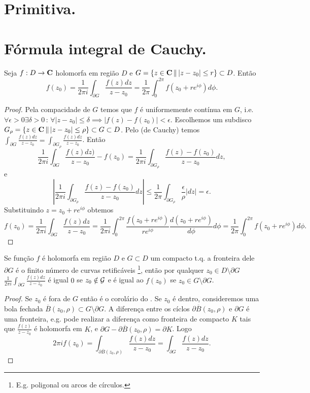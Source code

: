 \section{Primitiva.}


\section{Fórmula integral de Cauchy.}

\begin{teorema}
Seja $f : D \to \mathbf{C}$ holomorfa em região $D$
e $G = \{ z\in\mathbf{C} \,\|\, |z-z_0| \leq r \} \subset D$. Então
\[ f(z_0) = \frac1{2\pi i} \int_{\partial G} \frac{f(z)dz}{z-z_0} = \frac1{2\pi} \int_0^{2\pi} f(z_0 + r e^{i\phi}) d\phi. \]
\end{teorema}
\begin{proof}
Pela compacidade de $G$ temos que $f$ é uniformemente contínua em $G$, i.e.
$\forall \epsilon > 0 \exists\delta >0 \,:\, \forall |z-z_0|\leq\delta \implies |f(z)-f(z_0)| < \epsilon$.
Escolhemos um subdisco $G_\rho = \{ z\in\mathbf{C} \,\|\, |z-z_0| \leq \rho \} \subset G \subset D$.
Pelo  (de Cauchy) temos
$\int_{\partial G} \frac{f(z) dz}{z-z_0} = \int_{\partial G_\rho} \frac{f(z) dz}{z-z_0}$.
Então
\begin{equation*}
\frac1{2\pi i} \int_{\partial G} \frac{f(z)dz)}{z-z_0} - f(z_0) = \frac1{2\pi i} \int_{\partial G_\rho} \frac{f(z)-f(z_0)}{z-z_0} dz, 
\end{equation*}
e 
\[|\frac1{2\pi i} \int_{\partial G_\rho} \frac{f(z)-f(z_0)}{z-z_0} dz| \leq \frac1{2\pi} \int_{\partial G_\rho} \frac{\epsilon}{\rho} |dz| = \epsilon. \]
Substituindo $z = z_0 + r e^{i\phi}$ obtemos
\[ f(z_0) = \frac{1}{2\pi i} \int_{\partial G} \frac{f(z)dz}{z-z_0} = 
\frac{1}{2\pi i} \int_0^{2\pi} \frac{f(z_0 + r e^{i\phi})}{r e^{i\phi}} \frac{d(z_0+re^{i\phi})}{d\phi} d\phi
= \frac1{2\pi} \int_0^{2\pi} f(z_0 + r e^{i\phi}) d\phi. \]
\end{proof}

\begin{teorema}[Cauchy]
Se função $f$ é holomorfa em região $D$ e $G\subset D$ um compacto t.q. a fronteira dele $\partial G$ é o finito número de curvas retificáveis
\footnote{E.g. poligonal ou arcos de círculos.},
então por qualquer $z_0 \in D \setminus \partial G$
$\frac1{2\pi i} \int_{\partial G} \frac{f(z)dz}{z-z_0}$  é igual $0$ se $z_0 \notin \mathcal{G}$ e é igual ao $f(z_0)$ se $z_0 \in G \setminus \partial G$.
\end{teorema}
\begin{proof}
Se $z_0$ é fora de $G$ então é o corolário do .
Se $z_0$ é dentro, consideremos uma bola fechada $\overline{B}(z_0,\rho)\subset G \setminus \partial G$.
A diferença entre os cíclos $\partial \overline{B}(z_0,\rho)$ e $\partial G$ é uma fronteira,
e.g. pode realizar a diferença como fronteira de compacto $K$ tais que $\frac{f(z)}{z-z_0}$ é holomorfa em $K$,
e $\partial G - \partial \overline{B}(z_0,\rho) = \partial K$.
Logo 
\[ 2\pi i f(z_0) = \int_{\partial \overline{B}(z_0,\rho)} \frac{f(z)dz}{z-z_0} = \int_{\partial G} \frac{f(z)dz}{z-z_0}. \]
\end{proof}

